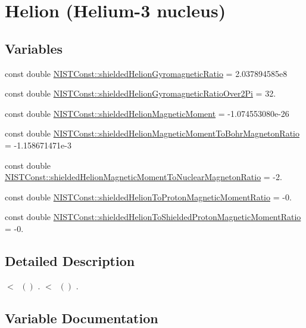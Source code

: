 \hypertarget{group___helion}{}\section{Helion (Helium-\/3 nucleus)}
\label{group___helion}
\subsection*{Variables}
\begin{DoxyCompactItemize}
\item 
const double \hyperlink{group___helion_gaf3b7dabd6de7a263aba710256e793c8e}{N\+I\+S\+T\+Const\+::shielded\+Helion\+Gyromagnetic\+Ratio} = 2.\+037894585e8
\item 
const double \hyperlink{group___helion_gaed43f2ab9c5e89c6dda577a3b5fc265c}{N\+I\+S\+T\+Const\+::shielded\+Helion\+Gyromagnetic\+Ratio\+Over2\+Pi} = 32.
\item 
const double \hyperlink{group___helion_ga1b0f92c14390afe726af4005e21c2ae8}{N\+I\+S\+T\+Const\+::shielded\+Helion\+Magnetic\+Moment} = -\/1.\+074553080e-\/26
\item 
const double \hyperlink{group___helion_gac48304d45406c207fbadeca604d5c71a}{N\+I\+S\+T\+Const\+::shielded\+Helion\+Magnetic\+Moment\+To\+Bohr\+Magneton\+Ratio} = -\/1.\+158671471e-\/3
\item 
const double \hyperlink{group___helion_gae3bf1eccb33e00a6da688959fd99bbb3}{N\+I\+S\+T\+Const\+::shielded\+Helion\+Magnetic\+Moment\+To\+Nuclear\+Magneton\+Ratio} = -\/2.
\item 
const double \hyperlink{group___helion_ga9aa0ad55bc28f6402fcd872f9435547e}{N\+I\+S\+T\+Const\+::shielded\+Helion\+To\+Proton\+Magnetic\+Moment\+Ratio} = -\/0.
\item 
const double \hyperlink{group___helion_ga3b8301672e9de426ef6bf13276b42acc}{N\+I\+S\+T\+Const\+::shielded\+Helion\+To\+Shielded\+Proton\+Magnetic\+Moment\+Ratio} = -\/0.
\end{DoxyCompactItemize}


\subsection{Detailed Description}
$<$ $ \ ()$ . $<$ $ \ ()$ . 

\subsection{Variable Documentation}
\mbox{\label{group___helion_gaf3b7dabd6de7a263aba710256e793c8e}} 
